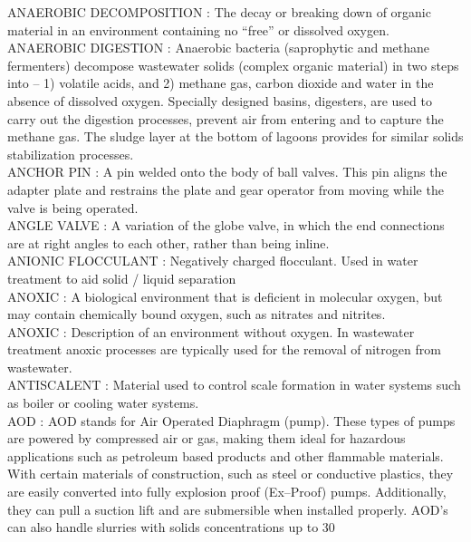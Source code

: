 ANAEROBIC DECOMPOSITION :  The decay or breaking down of organic material in an environment containing no “free” or dissolved oxygen. \\
\vspace{0.15cm}
ANAEROBIC DIGESTION :  Anaerobic bacteria (saprophytic and methane fermenters) decompose wastewater solids (complex organic material) in two steps into – 1) volatile acids, and 2) methane gas, carbon dioxide and water in the absence of dissolved oxygen. Specially designed basins, digesters, are used to carry out the digestion processes, prevent air from entering and to capture the methane gas. The sludge layer at the bottom of lagoons provides for similar solids stabilization processes.\\
\vspace{0.15cm}
ANCHOR PIN :   A pin welded onto the body of ball valves. This pin aligns the adapter plate and restrains the plate and gear operator from moving while the valve is being operated.\\
\vspace{0.15cm}
ANGLE VALVE :   A variation of the globe valve, in which the end connections are at right angles to each other, rather than being inline.\\
\vspace{0.15cm}
ANIONIC FLOCCULANT :  Negatively charged flocculant. Used in water treatment to aid solid / liquid separation\\
\vspace{0.15cm}
ANOXIC :   A biological environment that is deficient in molecular oxygen, but may contain chemically bound oxygen, such as nitrates and nitrites.\\
\vspace{0.15cm}
ANOXIC :  Description of an environment without oxygen. In wastewater treatment anoxic processes are typically used for the removal of nitrogen from wastewater.\\
\vspace{0.15cm}
ANTISCALENT :  Material used to control scale formation in water systems such as boiler or cooling water systems.\\
\vspace{0.15cm}
AOD :   AOD stands for Air Operated Diaphragm (pump). These types of pumps are powered by compressed air or gas, making them ideal for hazardous applications such as petroleum based products and other flammable materials. With certain materials of construction, such as steel or conductive plastics, they are easily converted into fully explosion proof (Ex–Proof) pumps. Additionally, they can pull a suction lift and are submersible when installed properly. AOD’s can also handle slurries with solids concentrations up to 30%
